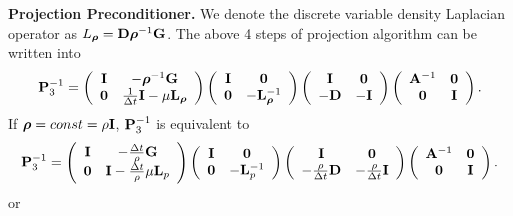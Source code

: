 \documentclass[9pt]{article}
\newcommand{\V}[1]{\boldsymbol{#1}}
\begin{document}
{\bf Projection Preconditioner.} We denote the discrete variable density Laplacian operator as $L_{\V{\rho}}  = {\bf D} \V{\rho}^{-1} {\bf G}$. The above 4 steps of projection algorithm can be written into
\begin{equation}\label{P3_variable_density}
{\bf P}_3^{-1}=\left(\begin{array}{cc}
{\bf I} & - {\V{\rho}}^{-1}{\bf G} \\
{\bf 0}      & \frac{1}{\Delta t}{\bf I}- \mu {\bf L}_{\V{\rho}}
\end{array}\right)
\left(\begin{array}{cc}
{\bf I}     &  {\bf 0} \\
{\bf 0}     &  -{\bf L}_{\V{\rho}}^{-1}
\end{array}\right)
\left(\begin{array}{cc}
{\bf I}     &  {\bf 0} \\
-{\bf D}     &  -{\bf I}
\end{array}\right)
\left(\begin{array}{cc}
{\bf A}^{-1}       & {\bf 0} \\
{\bf 0}            & {\bf I}
\end{array}\right).
\end{equation}
If ${\V{\rho}}=const=\rho {\bf I}$, ${\bf P}_3^{-1}$ is equivalent to
\begin{equation}\label{Boyce_precon}
{\bf P}_3^{-1}=\left(\begin{array}{cc}
{\bf I}   & -\frac{\Delta t}{\rho} {\bf G} \\
{\bf 0}   & {\bf I}-\frac{\Delta t}{\rho}\mu {\bf L}_p
\end{array}\right)
\left(\begin{array}{cc}
{\bf I}     &  {\bf 0} \\
{\bf 0}     &  -{\bf L}_p^{-1}
\end{array}\right)
\left(\begin{array}{cc}
{\bf I}     &  {\bf 0} \\
-\frac{\rho}{\Delta t}{\bf D}     &  -\frac{\rho}{\Delta t}{\bf I}
\end{array}\right)
\left(\begin{array}{cc}
{\bf A}^{-1}       & {\bf 0} \\
{\bf 0}            & {\bf I}
\end{array}\right).
\end{equation}
or
\end{document}
